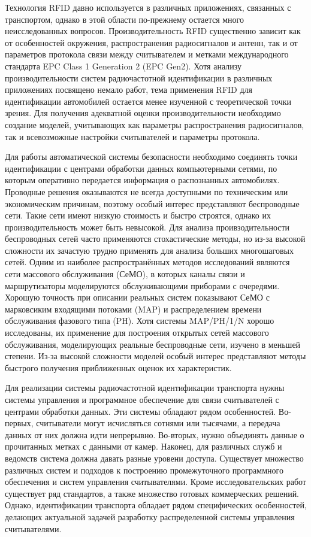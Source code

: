 Технология RFID давно используется в различных приложениях, связанных с транспортом, однако в этой области по-прежнему остается много неисследованных вопросов. Производительность RFID существенно зависит как от особенностей окружения, распространения радиосигналов и антенн, так и от параметров протокола связи между считывателем и метками международного стандарта EPC Class 1 Generation 2 (EPC Gen2). Хотя анализу производительности систем радиочастотной идентификации в различных приложениях посвящено немало работ, тема применения RFID для идентификации автомобилей остается менее изученной с теоретической точки зрения. Для получения адекватной оценки производительности необходимо создание моделей, учитывающих как параметры распространения радиосигналов, так и всевозможные настройки считывателей и параметры протокола.

Для работы автоматической системы безопасности необходимо соединять точки идентификации с центрами обработки данных компьютерными сетями, по которым оперативно передается информация о распознанных автомобилях. Проводные решения оказываются не всегда доступными по техническим или экономическим причинам, поэтому особый интерес представляют беспроводные сети. Такие сети имеют низкую стоимость и быстро строятся, однако их производительность может быть невысокой. Для анализа проивзодительности беспроводных сетей часто применяются стохастические методы, но из-за высокой сложности их зачастую трудно применять для анализа больших многошаговых сетей. Одним из наиболее распространённых методов исследований являются сети массового обслуживания (СеМО), в которых каналы связи и маршрутизаторы моделируются обслуживающими приборами с очередями. Хорошую точность при описании реальных систем показывают СеМО с марковсиким входящими потоками (MAP) и распределением времени обслуживания фазового типа (PH). Хотя системы MAP/PH/1/N хорошо исследованы, их применение для построения открытых сетей массового обслуживания, моделирующих реальные беспроводные сети, изучено в меньшей степени. Из-за высокой сложности моделей особый интерес представляют методы быстрого получения приближенных оценок их характеристик.

Для реализации системы радиочастотной идентификации транспорта нужны системы управления и программное обеспечение для связи считывателей с центрами обработки данных. Эти системы обладают рядом особенностей. Во-первых, считыватели могут исчисляться сотнями или тысячами, а передача данных от них должна идти непрерывно. Во-вторых, нужно объединять данные о прочитанных метках с данными от камер. Наконец, для различных служб и ведомств система должна давать разные уровени доступа. Существует множество различных систем и подходов к построению промежуточного программного обеспечения и систем управления считывателями. Кроме исследовательских работ существует ряд стандартов, а также множество готовых коммерческих решений. Однако, идентификации транспорта обладает рядом специфических особенностей, делающих актуальной задачей разработку распределенной системы управления считывателями.

